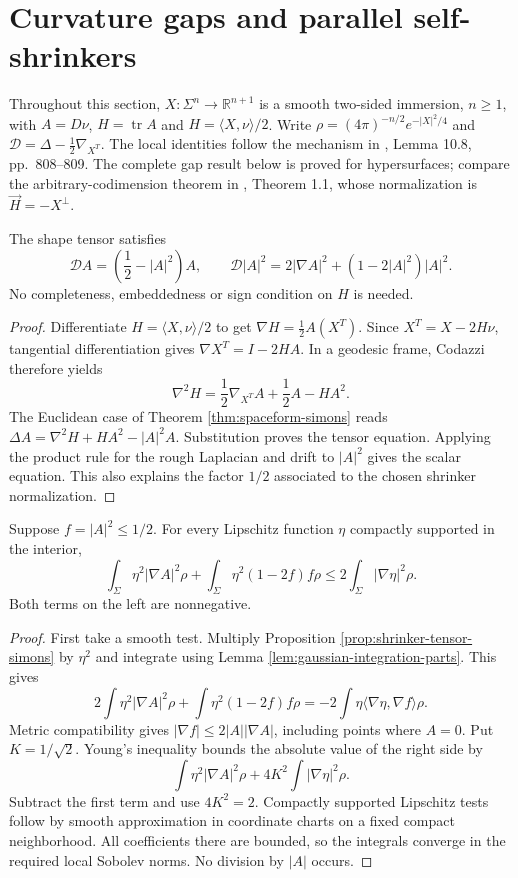 \chapter{Curvature gaps and parallel self-shrinkers}\label{sec:shrinker-curvature-gap}
Throughout this section, $X:\Sigma^n\to\mathbb R^{n+1}$ is a smooth two-sided immersion, $n\geq1$, with $A=D\nu$, $H=\operatorname{tr}A$ and $H=\langle X,\nu\rangle/2$. Write $\rho=(4\pi)^{-n/2}e^{-|X|^2/4}$ and $\mathcal D=\Delta-\frac12\nabla_{X^T}$. The local identities follow the mechanism in \cite{CM12}, Lemma 10.8, pp.~808--809. The complete gap result below is proved for hypersurfaces; compare the arbitrary-codimension theorem in \cite{CL12}, Theorem 1.1, whose normalization is $\vec H=-X^\perp$.

\begin{proposition}\label{prop:shrinker-tensor-simons}
The shape tensor satisfies
\[
 \mathcal D A=\left(\frac12-|A|^2\right)A,\qquad
 \mathcal D|A|^2=2|\nabla A|^2+(1-2|A|^2)|A|^2.
\]
No completeness, embeddedness or sign condition on $H$ is needed.
\end{proposition}
\begin{proof}
Differentiate $H=\langle X,\nu\rangle/2$ to get $\nabla H=\frac12A(X^T)$. Since $X^T=X-2H\nu$, tangential differentiation gives $\nabla X^T=I-2HA$. In a geodesic frame, Codazzi therefore yields
\[
 \nabla^2H=\frac12\nabla_{X^T}A+\frac12A-HA^2.
\]
The Euclidean case of Theorem \ref{thm:spaceform-simons} reads $\Delta A=\nabla^2H+HA^2-|A|^2A$. Substitution proves the tensor equation. Applying the product rule for the rough Laplacian and drift to $|A|^2$ gives the scalar equation. This also explains the factor $1/2$ associated to the chosen shrinker normalization.
\end{proof}

\begin{lemma}\label{lem:shrinker-gap-caccioppoli}
Suppose $f=|A|^2\leq1/2$. For every Lipschitz function $\eta$ compactly supported in the interior,
\[
 \int_\Sigma\eta^2|\nabla A|^2\rho
 +\int_\Sigma\eta^2(1-2f)f\rho
 \leq 2\int_\Sigma|\nabla\eta|^2\rho.
\]
Both terms on the left are nonnegative.
\end{lemma}
\begin{proof}
First take a smooth test. Multiply Proposition \ref{prop:shrinker-tensor-simons} by $\eta^2$ and integrate using Lemma \ref{lem:gaussian-integration-parts}. This gives
\[
 2\int\eta^2|\nabla A|^2\rho+\int\eta^2(1-2f)f\rho
 =-2\int\eta\langle\nabla\eta,\nabla f\rangle\rho.
\]
Metric compatibility gives $|\nabla f|\leq2|A||\nabla A|$, including points where $A=0$. Put $K=1/\sqrt2$. Young's inequality bounds the absolute value of the right side by
\[
 \int\eta^2|\nabla A|^2\rho+4K^2\int|\nabla\eta|^2\rho.
\]
Subtract the first term and use $4K^2=2$. Compactly supported Lipschitz tests follow by smooth approximation in coordinate charts on a fixed compact neighborhood. All coefficients there are bounded, so the integrals converge in the required local Sobolev norms. No division by $|A|$ occurs.
\end{proof}

